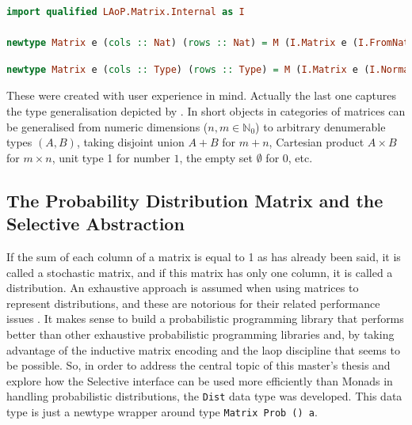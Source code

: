 \documentclass[
  oneside,
  11pt, a4paper,
  footinclude=true,
  headinclude=true,
  cleardoublepage=empty
]{scrbook}
\theoremstyle{definition}
\theoremstyle{definition}
\begin{document}
        \begin{lstlisting}[language=Haskell, caption={Dimensions are type level naturals},captionpos=b]
import qualified LAoP.Matrix.Internal as I

newtype Matrix e (cols :: Nat) (rows :: Nat) = M (I.Matrix e (I.FromNat cols) (I.FromNat rows))
        \end{lstlisting}
        
        \begin{lstlisting}[language=Haskell, caption={Dimensions are arbitrary data types},captionpos=b]
newtype Matrix e (cols :: Type) (rows :: Type) = M (I.Matrix e (I.Normalize cols) (I.Normalize rows))
        \end{lstlisting}
        
        These were created with user experience in mind. Actually the last one captures the type generalisation depicted by \cite{oliveira2012towards}. In short objects in categories of matrices can be generalised from numeric dimensions ($n, m \in \mathbb{N}_0$) to arbitrary denumerable types $(A,B)$, taking disjoint union $A + B$ for $m + n$, Cartesian product $A \times B$ for $m \times n$, unit type 1 for number $1$, the empty set $\emptyset$ for $0$, etc.
        
        \subsection{The Probability Distribution Matrix and the Selective Abstraction}
        
        If the sum of each column of a matrix is equal to 1 as has already been said, it is called a stochastic matrix, and if this matrix has only one column, it is called a distribution. An exhaustive approach is assumed when using matrices to represent distributions, and these are notorious for their related performance issues \citep{Scibior:2015:PPP:2887747.2804317, kidd2007build}. It makes sense to build a probabilistic programming library that performs better than other exhaustive probabilistic programming libraries and, by taking advantage of the inductive matrix encoding and the \gls{laop} discipline that seems to be possible. So, in order to address the central topic of this master's thesis and explore how the Selective interface can be used more efficiently than Monads in handling probabilistic distributions, the \texttt{Dist} data type was developed. This data type is just a newtype wrapper around type \texttt{Matrix Prob () a}.
        
\end{document}
